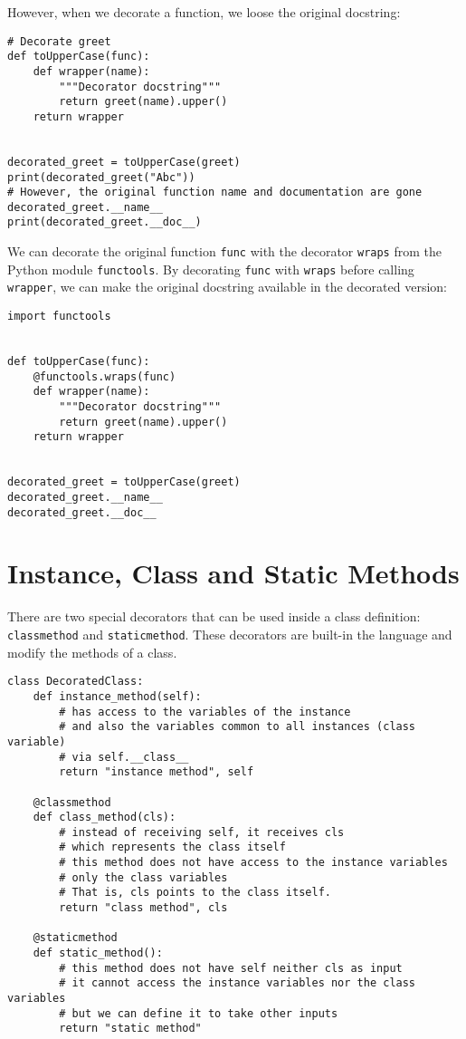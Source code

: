 \documentclass[12pt, a4paper]{article}
\begin{document}
However, when we decorate a function, we loose the original docstring:
\lstset{language=jupyter-python,label= ,caption= ,captionpos=b,numbers=none}
\begin{lstlisting}
# Decorate greet
def toUpperCase(func):
    def wrapper(name):
        """Decorator docstring"""
        return greet(name).upper()
    return wrapper


decorated_greet = toUpperCase(greet)
print(decorated_greet("Abc"))
# However, the original function name and documentation are gone
decorated_greet.__name__
print(decorated_greet.__doc__)
\end{lstlisting}

We can decorate the original function \texttt{func} with the decorator \texttt{wraps} from the Python module \texttt{functools}.
By decorating \texttt{func} with \texttt{wraps} before calling \texttt{wrapper}, we can make the original docstring available in the decorated version:
\lstset{language=jupyter-python,label= ,caption= ,captionpos=b,numbers=none}
\begin{lstlisting}
import functools


def toUpperCase(func):
    @functools.wraps(func)
    def wrapper(name):
        """Decorator docstring"""
        return greet(name).upper()
    return wrapper


decorated_greet = toUpperCase(greet)
decorated_greet.__name__
decorated_greet.__doc__
\end{lstlisting}
\section{Instance, Class and Static Methods}
\label{sec:orgd477740}
There are two special decorators that can be used inside a class definition: \texttt{classmethod} and \texttt{staticmethod}.
These decorators are built-in the language and modify the methods of a class.
\lstset{language=jupyter-python,label= ,caption= ,captionpos=b,numbers=none}
\begin{lstlisting}
class DecoratedClass:
    def instance_method(self):
        # has access to the variables of the instance
        # and also the variables common to all instances (class variable)
        # via self.__class__
        return "instance method", self

    @classmethod
    def class_method(cls):
        # instead of receiving self, it receives cls
        # which represents the class itself
        # this method does not have access to the instance variables
        # only the class variables
        # That is, cls points to the class itself.
        return "class method", cls

    @staticmethod
    def static_method():
        # this method does not have self neither cls as input
        # it cannot access the instance variables nor the class variables
        # but we can define it to take other inputs
        return "static method"
\end{lstlisting}
\end{document}
